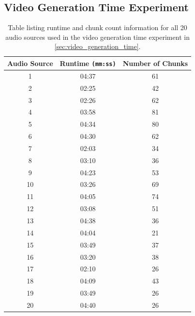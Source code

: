 \documentclass{l4proj}
\begin{document}
\begin{appendices}
\chapter{Video Generation Time Experiment}
\begin{table}
    \centering
    \begin{tabular}{|c|c|c|}
        \hline
        \textbf{Audio Source} & \textbf{Runtime \lstinline|(mm:ss)|} & \textbf{Number of Chunks} \\
        \hline
        \hline
        1 & 04:37 & 61 \\
        \hline
        2 & 02:25 & 42 \\
        \hline
        3 & 02:26 & 62 \\
        \hline
        4 & 03:58 & 81 \\
        \hline
        5 & 04:34 & 80 \\
        \hline
        6 & 04:30 & 62 \\
        \hline
        7 & 02:03 & 34 \\
        \hline
        8 & 03:10 & 36 \\
        \hline
        9 & 04:23 & 53 \\
        \hline
        10 & 03:26 & 69 \\
        \hline
        11 & 04:05 & 74 \\
        \hline
        12 & 03:08 & 51 \\
        \hline
        13 & 04:38 & 36 \\
        \hline
        14 & 04:04 & 21 \\
        \hline
        15 & 03:49 & 37 \\
        \hline
        16 & 03:20 & 38 \\
        \hline
        17 & 02:10 & 26 \\
        \hline
        18 & 04:09 & 43 \\
        \hline
        19 & 03:49 & 26 \\
        \hline
        20 & 04:40 & 26 \\
        \hline
    \end{tabular}
    \caption{Table listing runtime and chunk count information for all 20 audio sources used in the video generation time experiment in \ref{sec:video_generation_time}.}\label{tab:audio_sources}
\end{table}


\end{appendices}
\end{document}
